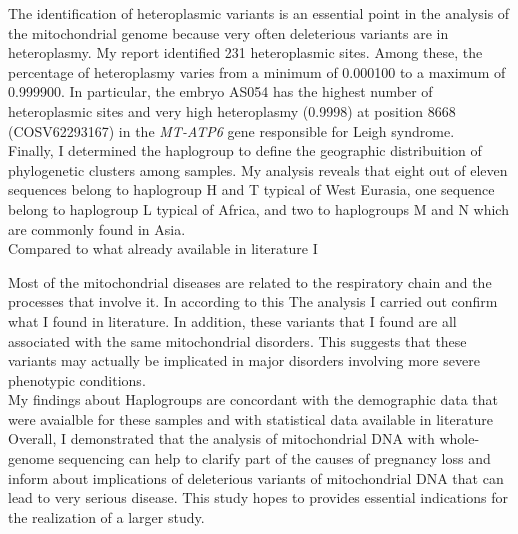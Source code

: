 The identification of heteroplasmic variants is an essential point in the analysis of the mitochondrial genome because very often deleterious variants are in heteroplasmy. My report identified 231 heteroplasmic sites. Among these, the percentage of heteroplasmy varies from a minimum of 0.000100  to a maximum of 0.999900. In particular, the embryo AS054 has the highest number of heteroplasmic sites and very high heteroplasmy (0.9998) at position 8668 (COSV62293167) in the \textit{MT-ATP6} gene responsible for Leigh syndrome.\\


Finally, I determined the haplogroup to  define the geographic distribuition of phylogenetic clusters among samples. My analysis reveals that eight out of eleven sequences belong to haplogroup H and T typical of West Eurasia, one sequence belong to haplogroup L typical of Africa, and two to haplogroups M and N which are commonly found in Asia. \\



Compared to what already available in literature I 

Most of the mitochondrial diseases are related to the respiratory chain and the processes that involve it. In according to this The analysis I carried out confirm what I found in literature. 
In addition, these variants that I found are all associated with the same mitochondrial disorders. This suggests that these variants may actually be implicated in major disorders involving more severe phenotypic conditions.\\
My findings about Haplogroups are concordant with the demographic
data that were avaialble for these samples and with statistical
data available in literature \\


Overall, I demonstrated that the analysis of mitochondrial DNA with
whole-genome sequencing  can help to clarify part of the causes of
pregnancy loss and inform about implications of deleterious
variants of mitochondrial DNA that can lead to very serious disease.
This study hopes to provides essential indications for the realization of a larger study.







